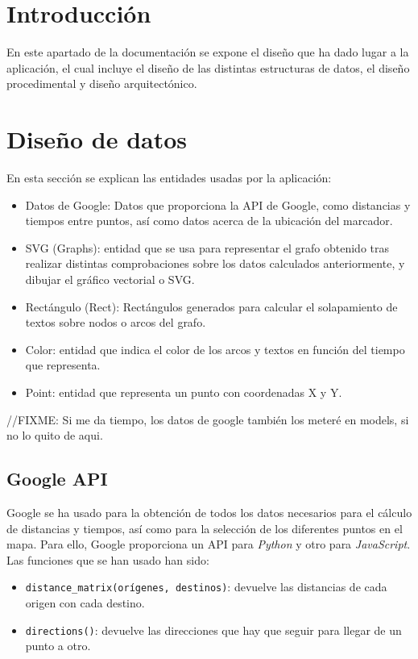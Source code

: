 
\section{Introducción}
En este apartado de la documentación se expone el diseño que ha dado lugar a la aplicación, el cual incluye el diseño de las distintas estructuras de datos, el diseño procedimental y diseño arquitectónico.

\section{Diseño de datos}
En esta sección se explican las entidades usadas por la aplicación:
\begin{itemize}
	\item Datos de Google: Datos que proporciona la API de Google, como distancias y tiempos entre puntos, así como datos acerca de la ubicación del marcador.
	\item SVG (Graphs): entidad que se usa para representar el grafo obtenido tras realizar distintas comprobaciones sobre los datos calculados anteriormente, y dibujar el gráfico vectorial o SVG.
	\item Rectángulo (Rect): Rectángulos generados para calcular el solapamiento de textos sobre nodos o arcos del grafo.
	\item Color: entidad que indica el color de los arcos y textos en función del tiempo que representa.
	\item Point: entidad que representa un punto con coordenadas X y Y.
\end{itemize}

//FIXME: Si me da tiempo, los datos de google también los meteré en models, si no lo quito de aqui.


\subsection{Google API}
Google se ha usado para la obtención de todos los datos necesarios para el cálculo de distancias y tiempos, así como para la selección de los diferentes puntos en el mapa. Para ello, Google proporciona un API para \textit{Python} y otro para \textit{JavaScript}. Las funciones que se han usado han sido:
\begin{itemize}
	\item \texttt{distance\_matrix(orígenes, destinos)}: devuelve las distancias de cada origen con cada destino.
	\item \texttt{directions()}: devuelve las direcciones que hay que seguir para llegar de un punto a otro.
\end{itemize}

